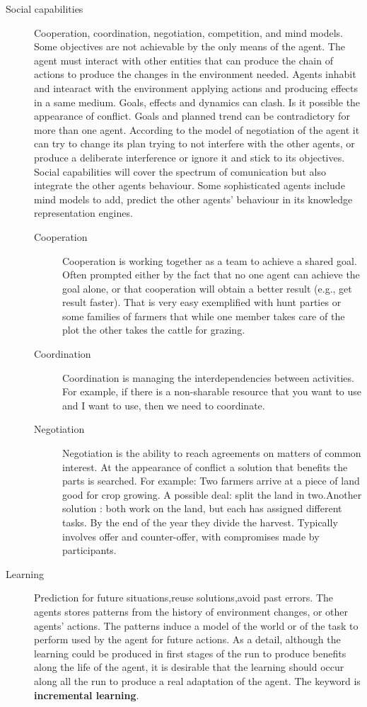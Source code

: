 \documentclass[11pt,oneside,a4paper,openright]{report}
\begin{document}
\begin{description}
	\item [Social capabilities] Cooperation, coordination, negotiation, competition, and mind models.
	Some objectives are not achievable by the only means of the agent. The agent must interact
	with other entities that can produce the chain of actions to produce the changes in the
	environment needed.
	Agents inhabit and intearact with the environment applying actions and producing effects
	in a same medium. Goals, effects and dynamics can clash. Is it possible the appearance of
	conflict. Goals and planned trend can be contradictory for more than one agent. According
	to the model of negotiation of the agent it can try to change its plan trying to not interfere
	with the other agents, or produce a deliberate interference or ignore it and stick to its
	objectives.
	Social capabilities will cover the spectrum of comunication but also integrate the other agents
	behaviour. Some sophisticated agents include mind models to add, predict the other agents' 
	behaviour in its knowledge representation engines.
	\begin{description}
		\item [Cooperation] Cooperation is working together as a team to achieve a shared goal.
		Often prompted either by the fact that no one agent can achieve the goal alone, or that 
		cooperation will obtain a better result (e.g., get result faster). That is very easy
		exemplified with hunt parties or some families of farmers that while one member takes care
		of the plot the other takes the cattle for grazing.

		\item [Coordination] Coordination is managing the interdependencies between activities.
		For example, if there is a non-sharable resource that you want to use and I want to use, 
		then we need to coordinate.

		\item [Negotiation] Negotiation is the ability to reach agreements on matters of common 
		interest. At the appearance of conflict a solution that benefits the parts is searched.
		For example: Two farmers arrive at a piece of land good for crop growing. A possible deal: split
		the land in two.Another solution : both work on the land, but each has assigned different
		tasks. By the end of the year they divide the harvest. Typically involves offer and 
		counter-offer, with compromises made by participants.

	\end{description}

	\item [Learning] Prediction for future situations,reuse solutions,avoid past errors. The agents stores
	patterns from the history of environment changes, or other agents' actions. The patterns induce a model
	of the world or of the task to perform used by the agent for future actions. As a detail, although the 
	learning could be produced in first stages of the run to produce benefits along the life of the agent,
	it is desirable that the learning should occur along all the run to produce a real adaptation of the 
	agent. The keyword is \textbf{incremental learning}.
\end{description}
\end{document}
